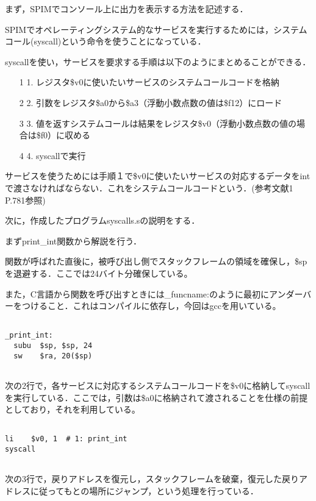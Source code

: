\documentclass[a4j]{jarticle}
\begin{document}
まず，SPIMでコンソール上に出力を表示する方法を記述する．

SPIMでオペレーティングシステム的なサービスを実行するためには，システムコール(syscall)という命令を使うことになっている．

syscallを使い，サービスを要求する手順は以下のようにまとめることができる．

\begin{itemize}
\item[1]1. レジスタ\$v0に使いたいサービスのシステムコールコードを格納
\item[2]2. 引数をレジスタ\$a0から\$a3（浮動小数点数の値は\$f12）にロード
\item[3]3. 値を返すシステムコールは結果をレジスタ\$v0（浮動小数点数の値の場合は\$f0）に収める
\item[4]4. syscallで実行
\end{itemize}

サービスを使うためには手順１で\$v0に使いたいサービスの対応するデータをintで渡さなければならない．これをシステムコールコードという．(参考文献1 P.781参照)


次に，作成したプログラムsyscalls.sの説明をする．

まずprint\_int関数から解説を行う．


関数が呼ばれた直後に，被呼び出し側でスタックフレームの領域を確保し，\$spを退避する．ここでは24バイト分確保している。

また，C言語から関数を呼び出すときには\_funcname:のように最初にアンダーバーをつけること．これはコンパイルに依存し，今回はgccを用いている。　

{\baselineskip 3mm
\begin{verbatim}

_print_int:
  subu  $sp, $sp, 24
  sw    $ra, 20($sp)
 
\end{verbatim}
}

次の2行で，各サービスに対応するシステムコールコードを\$v0に格納してsyscallを実行している．ここでは，引数は\$a0に格納されて渡されることを仕様の前提としており，それを利用している。

{\baselineskip 3mm
\begin{verbatim}

li    $v0, 1  # 1: print_int
syscall
 
\end{verbatim}
}

次の3行で，戻りアドレスを復元し，スタックフレームを破棄，復元した戻りアドレスに従ってもとの場所にジャンプ，という処理を行っている．
\end{document}
